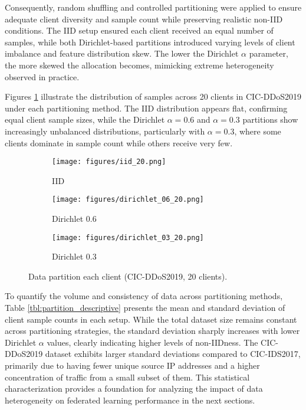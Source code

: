 Consequently, random shuffling and controlled partitioning were applied to ensure adequate client diversity and sample count while preserving realistic non-IID conditions. The IID setup ensured each client received an equal number of samples, while both Dirichlet-based partitions introduced varying levels of client imbalance and feature distribution skew. The lower the Dirichlet $\alpha$ parameter, the more skewed the allocation becomes, mimicking extreme heterogeneity observed in practice.

Figures \ref{fig:partition_distributions} illustrate the distribution of samples across 20 clients in CIC-DDoS2019 under each partitioning method. The IID distribution appears flat, confirming equal client sample sizes, while the Dirichlet $\alpha=0.6$ and $\alpha=0.3$ partitions show increasingly unbalanced distributions, particularly with $\alpha=0.3$, where some clients dominate in sample count while others receive very few.

\begin{figure}[h]
    \centering

    \begin{subfigure}[b]{0.32\textwidth}
        \centering
        \texttt{[image: figures/iid\_20.png]}
        \caption{IID}
    \end{subfigure}
    \hfill
    \begin{subfigure}[b]{0.32\textwidth}
        \centering
        \texttt{[image: figures/dirichlet\_06\_20.png]}
        \caption{Dirichlet 0.6}
    \end{subfigure}
    \hfill
    \begin{subfigure}[b]{0.32\textwidth}
        \centering
        \texttt{[image: figures/dirichlet\_03\_20.png]}
        \caption{Dirichlet 0.3}
    \end{subfigure}

    \caption{Data partition each client (CIC-DDoS2019, 20 clients).}
    \label{fig:partition_distributions}
\end{figure}

To quantify the volume and consistency of data across partitioning methods, Table \ref{tbl:partition_descriptive} presents the mean and standard deviation of client sample counts in each setup. While the total dataset size remains constant across partitioning strategies, the standard deviation sharply increases with lower Dirichlet $\alpha$ values, clearly indicating higher levels of non-IIDness. The CIC-DDoS2019 dataset exhibits larger standard deviations compared to CIC-IDS2017, primarily due to having fewer unique source IP addresses and a higher concentration of traffic from a small subset of them. This statistical characterization provides a foundation for analyzing the impact of data heterogeneity on federated learning performance in the next sections.

